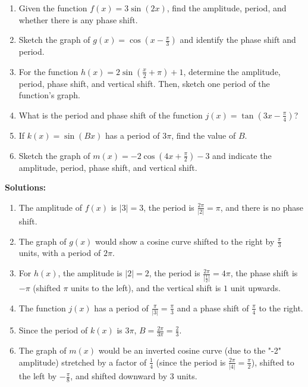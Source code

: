 \documentclass[a4paper,12pt]{book}
\begin{document}
\begin{enumerate}
    \item Given the function \( f(x) = 3 \sin(2x) \), find the amplitude, period, and whether there is any phase shift.
    \item Sketch the graph of \( g(x) = \cos(x - \frac{\pi}{3}) \) and identify the phase shift and period.
    \item For the function \( h(x) = 2 \sin(\frac{x}{2} + \pi) + 1 \), determine the amplitude, period, phase shift, and vertical shift. Then, sketch one period of the function's graph.
    \item What is the period and phase shift of the function \( j(x) = \tan(3x - \frac{\pi}{4}) \)?
    \item If \( k(x) = \sin(Bx) \) has a period of \( 3\pi \), find the value of \( B \).
    \item Sketch the graph of \( m(x) = -2 \cos(4x + \frac{\pi}{2}) - 3 \) and indicate the amplitude, period, phase shift, and vertical shift.
\end{enumerate}

\textbf{Solutions:}

\begin{enumerate}
    \item The amplitude of \( f(x) \) is \( |3| = 3 \), the period is \( \frac{2\pi}{|2|} = \pi \), and there is no phase shift.
    \item The graph of \( g(x) \) would show a cosine curve shifted to the right by \( \frac{\pi}{3} \) units, with a period of \( 2\pi \).
    \item For \( h(x) \), the amplitude is \( |2| = 2 \), the period is \( \frac{2\pi}{|\frac{1}{2}|} = 4\pi \), the phase shift is \( -\pi \) (shifted \( \pi \) units to the left), and the vertical shift is \( 1 \) unit upwards.
    \item The function \( j(x) \) has a period of \( \frac{\pi}{|3|} = \frac{\pi}{3} \) and a phase shift of \( \frac{\pi}{4} \) to the right.
    \item Since the period of \( k(x) \) is \( 3\pi \), \( B = \frac{2\pi}{3\pi} = \frac{2}{3} \).
    \item The graph of \( m(x) \) would be an inverted cosine curve (due to the "-2" amplitude) stretched by a factor of \( \frac{1}{4} \) (since the period is \( \frac{2\pi}{|4|} = \frac{\pi}{2} \)), shifted to the left by \( -\frac{\pi}{8} \), and shifted downward by 3 units.
\end{enumerate}
\end{document}
